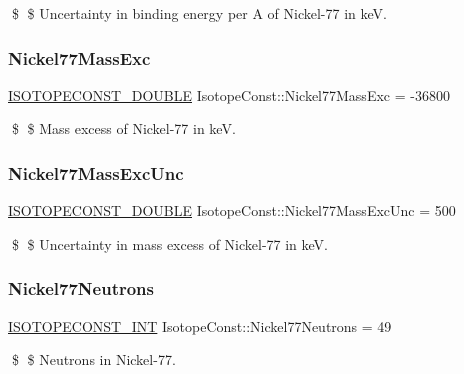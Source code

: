 \$ \$ Uncertainty in binding energy per A of Nickel-\/77 in keV. \mbox{\label{group___isotope_const-_nickel-_ni77_ga3c7501a948676bf78fd29b1f47511cf8}} 
\subsubsection{\texorpdfstring{Nickel77\+Mass\+Exc}{Nickel77MassExc}}
{\footnotesize\ttfamily \mbox{\hyperlink{group___isotope_const-_macros_ga8f45a7272ce02c0b4c65c44636ed719a}{I\+S\+O\+T\+O\+P\+E\+C\+O\+N\+S\+T\+\_\+\+D\+O\+U\+B\+LE}} Isotope\+Const\+::\+Nickel77\+Mass\+Exc = -\/36800}

\$ \$ Mass excess of Nickel-\/77 in keV. \mbox{\label{group___isotope_const-_nickel-_ni77_ga1d947bad7c8c8cc381b6357756ad610e}} 
\subsubsection{\texorpdfstring{Nickel77\+Mass\+Exc\+Unc}{Nickel77MassExcUnc}}
{\footnotesize\ttfamily \mbox{\hyperlink{group___isotope_const-_macros_ga8f45a7272ce02c0b4c65c44636ed719a}{I\+S\+O\+T\+O\+P\+E\+C\+O\+N\+S\+T\+\_\+\+D\+O\+U\+B\+LE}} Isotope\+Const\+::\+Nickel77\+Mass\+Exc\+Unc = 500}

\$ \$ Uncertainty in mass excess of Nickel-\/77 in keV. \mbox{\label{group___isotope_const-_nickel-_ni77_ga28125479c838c5a15ec10650762cd8b4}} 
\subsubsection{\texorpdfstring{Nickel77\+Neutrons}{Nickel77Neutrons}}
{\footnotesize\ttfamily \mbox{\hyperlink{group___isotope_const-_macros_ga5f18360b3e99483a35c32d789e62621c}{I\+S\+O\+T\+O\+P\+E\+C\+O\+N\+S\+T\+\_\+\+I\+NT}} Isotope\+Const\+::\+Nickel77\+Neutrons = 49}

\$ \$ Neutrons in Nickel-\/77. \mbox{\label{group___isotope_const-_nickel-_ni77_ga4c9e5bf26cbaecfd4531771a40598d36}} 
